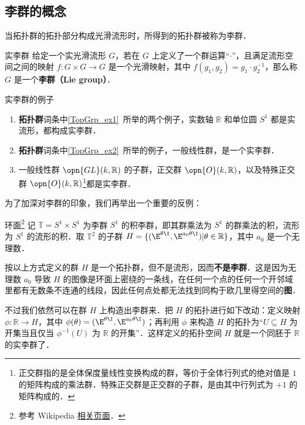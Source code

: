 

\begin{issues}
\issueDraft
\end{issues}


\subsection{李群的概念}

当拓扑群的拓扑部分构成光滑流形时，所得到的拓扑群被称为李群．

\begin{definition}{实李群}\label{LieGrp_def1}
给定一个实光滑流形 $G$，若在 $G$ 上定义了一个群运算“$\cdot$”，且满足流形空间之间的映射 $f:G\times G\rightarrow G$ 是一个光滑映射，其中 $f(g_1, g_2)=g_1\cdot g_2^{-1}$，那么称 $G$ 是一个\textbf{李群（Lie group）}．
\end{definition}

\begin{example}{实李群的例子}
\begin{enumerate}
\item \textbf{拓扑群}词条中\autoref{TopGrp_ex1}~所举的两个例子，实数轴 $\mathbb{R}$ 和单位圆 $S^1$ 都是实流形，都构成实李群．
\item \textbf{拓扑群}词条中\autoref{TopGrp_ex2}~所举的例子，一般线性群，是一个实李群．
\item 一般线性群 $\opn{GL}(k, \mathbb{R})$ 的子群，正交群 $\opn{O}(k, \mathbb{R})$，以及特殊正交群 $\opn{O}(k, \mathbb{R})$\footnote{正交群指的是全体保度量线性变换构成的群，等价于全体行列式的绝对值是 $1$ 的矩阵构成的乘法群．特殊正交群是正交群的子群，是由其中行列式为 $+1$ 的矩阵构成的．}都是实李群．
\end{enumerate}
\end{example}

为了加深对李群的印象，我们再举出一个重要的反例：

\begin{definition}{环面\footnote{参考 Wikipedia \href{https://en.wikipedia.org/wiki/Lie_group}{相关页面}．}}\label{LieGrp_def2}
记 $\mathbb{T}=S^1\times S^1$ 为李群 $S^1$ 的积李群，即其群乘法为 $S^1$ 的群乘法的积，流形为 $S^1$ 的流形的积．取 $\mathbb{T}^2$ 的子群 $H=\{(\E^{\theta\I}, \E^{a_0\theta\I})|\theta\in\mathbb{R}\}$，其中 $a_0$ 是一个无理数．

按以上方式定义的群 $H$ 是一个拓扑群，但不是流形，因而\textbf{不是李群}．这是因为无理数 $a_0$ 导致 $H$ 的图像是环面上密绕的一条线，在任何一个点的任何一个开邻域里都有无数条不连通的线段，因此任何点处都无法找到同构于欧几里得空间的\textbf{图}．

不过我们依然可以在群 $H$ 上构造出李群来．把 $H$ 的拓扑进行如下改动：定义映射 $\phi:\mathbb{R}\to H$，其中 $\phi(\theta)=(\E^{\theta\I}, \E^{a_0\theta\I})$；再利用 $\phi$ 来构造 $H$ 的拓扑为“$U\subseteq H$ 为开集当且仅当 $\phi^{-1}(U)$ 为 $\mathbb{R}$ 的开集”．这样定义的拓扑空间 $H$ 就是一个同胚于 $\mathbb{R}$ 的实李群了．
\end{definition}


